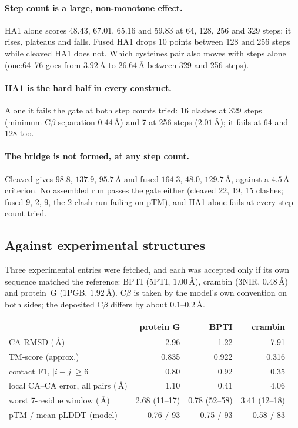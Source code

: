 \documentclass[11pt,a4paper]{article}
\newcommand{\ang}{\,\mbox{\AA}}
\begin{document}
\paragraph{Step count is a large, non-monotone effect.} HA1 alone scores
48.43, 67.01, 65.16 and 59.83 at 64, 128, 256 and 329 steps; it rises,
plateaus and falls. Fused HA1 drops 10 points between 128 and 256 steps while
cleaved HA1 does not. Which cysteines pair also moves with steps alone
(one:64--76 goes from $3.92\ang$ to $26.64\ang$ between 329 and 256 steps).

\paragraph{HA1 is the hard half in every construct.} Alone it fails the gate
at both step counts tried: 16 clashes at 329 steps (minimum C$\beta$
separation $0.44\ang$) and 7 at 256 steps ($2.01\ang$); it fails at 64 and 128 too.

\paragraph{The bridge is not formed, at any step count.} Cleaved gives
$98.8$, $137.9$, $95.7\ang$ and fused $164.3$, $48.0$, $129.7\ang$, against a
$4.5\ang$ criterion. No assembled run passes the gate either (cleaved 22, 19,
15 clashes; fused 9, 2, 9, the 2-clash run failing on pTM), and HA1 alone fails
at every step count tried.

\subsection{Against experimental structures}

Three experimental entries were fetched, and each was accepted only if its own
sequence matched the reference: BPTI (5PTI, $1.00\ang$), crambin (3NIR,
$0.48\ang$) and protein~G (1PGB, $1.92\ang$). C$\beta$ is taken by the model's
own convention on both sides; the deposited C$\beta$ differs by about
$0.1$--$0.2\ang$.

\begin{center}
\small
\setlength{\tabcolsep}{5pt}
\begin{tabular}{@{}lrrr@{}}
\toprule
 & protein G & BPTI & crambin \\
\midrule
CA RMSD ($\ang$) & 2.96 & 1.22 & 7.91 \\
TM-score (approx.) & 0.835 & 0.922 & 0.316 \\
contact F1, $|i-j|\ge 6$ & 0.80 & 0.92 & 0.35 \\
local CA--CA error, all pairs ($\ang$) & 1.10 & 0.41 & 4.06 \\
worst 7-residue window ($\ang$) & 2.68 (11--17) & 0.78 (52--58) & 3.41 (12--18) \\
pTM / mean pLDDT (model) & 0.76 / 93 & 0.75 / 93 & 0.58 / 83 \\
\bottomrule
\end{tabular}
\end{center}
\end{document}
